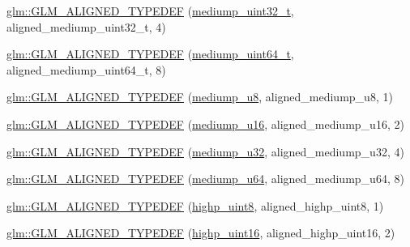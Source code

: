 \begin{DoxyCompactItemize}
\item 
\hyperlink{group__gtx__type__aligned_ga1dc8bc6199d785f235576948d80a597c}{glm\+::\+G\+L\+M\+\_\+\+A\+L\+I\+G\+N\+E\+D\+\_\+\+T\+Y\+P\+E\+D\+EF} (\hyperlink{group__gtc__type__precision_gac7782c1e393f9ad47e41a177a685f287}{mediump\+\_\+uint32\+\_\+t}, aligned\+\_\+mediump\+\_\+uint32\+\_\+t, 4)
\item 
\hyperlink{group__gtx__type__aligned_gad14a0f2ec93519682b73d70b8e401d81}{glm\+::\+G\+L\+M\+\_\+\+A\+L\+I\+G\+N\+E\+D\+\_\+\+T\+Y\+P\+E\+D\+EF} (\hyperlink{group__gtc__type__precision_gaa97354d3120a6dc029a5e9563723de18}{mediump\+\_\+uint64\+\_\+t}, aligned\+\_\+mediump\+\_\+uint64\+\_\+t, 8)
\item 
\hyperlink{group__gtx__type__aligned_gada8b996eb6526dc1ead813bd49539d1b}{glm\+::\+G\+L\+M\+\_\+\+A\+L\+I\+G\+N\+E\+D\+\_\+\+T\+Y\+P\+E\+D\+EF} (\hyperlink{group__gtc__type__precision_gac04b372784392e82bd557f300c4de097}{mediump\+\_\+u8}, aligned\+\_\+mediump\+\_\+u8, 1)
\item 
\hyperlink{group__gtx__type__aligned_ga28948f6bfb52b42deb9d73ae1ea8d8b0}{glm\+::\+G\+L\+M\+\_\+\+A\+L\+I\+G\+N\+E\+D\+\_\+\+T\+Y\+P\+E\+D\+EF} (\hyperlink{group__gtc__type__precision_ga6745262ef6a6fdb8637b2387ef924828}{mediump\+\_\+u16}, aligned\+\_\+mediump\+\_\+u16, 2)
\item 
\hyperlink{group__gtx__type__aligned_gad6a7c0b5630f89d3f1c5b4ef2919bb4c}{glm\+::\+G\+L\+M\+\_\+\+A\+L\+I\+G\+N\+E\+D\+\_\+\+T\+Y\+P\+E\+D\+EF} (\hyperlink{group__gtc__type__precision_gad0c27a525045c299a92306eb4cd7c13a}{mediump\+\_\+u32}, aligned\+\_\+mediump\+\_\+u32, 4)
\item 
\hyperlink{group__gtx__type__aligned_gaa0fc531cbaa972ac3a0b86d21ef4a7fa}{glm\+::\+G\+L\+M\+\_\+\+A\+L\+I\+G\+N\+E\+D\+\_\+\+T\+Y\+P\+E\+D\+EF} (\hyperlink{group__gtc__type__precision_ga00c51a16fa190b0a90205d50d6d8a44a}{mediump\+\_\+u64}, aligned\+\_\+mediump\+\_\+u64, 8)
\item 
\hyperlink{group__gtx__type__aligned_ga0ee829f7b754b262bbfe6317c0d678ac}{glm\+::\+G\+L\+M\+\_\+\+A\+L\+I\+G\+N\+E\+D\+\_\+\+T\+Y\+P\+E\+D\+EF} (\hyperlink{group__gtc__type__precision_ga2c27c6dd26e893786f04b10f99c1ee95}{highp\+\_\+uint8}, aligned\+\_\+highp\+\_\+uint8, 1)
\item 
\hyperlink{group__gtx__type__aligned_ga447848a817a626cae08cedc9778b331c}{glm\+::\+G\+L\+M\+\_\+\+A\+L\+I\+G\+N\+E\+D\+\_\+\+T\+Y\+P\+E\+D\+EF} (\hyperlink{group__gtc__type__precision_ga4d32967d45ba8365e2a05eaaac85e978}{highp\+\_\+uint16}, aligned\+\_\+highp\+\_\+uint16, 2)
\item 

\end{DoxyCompactItemize}
